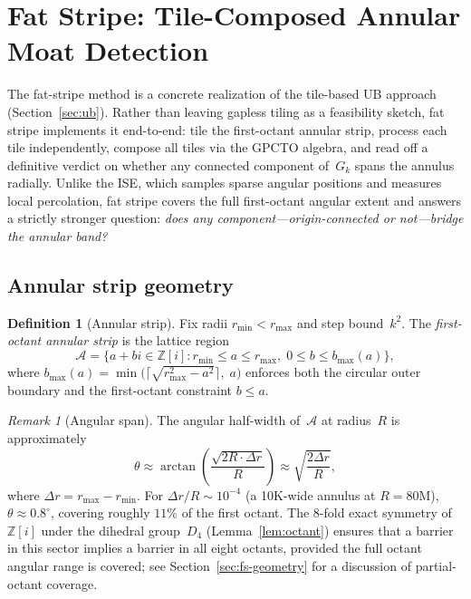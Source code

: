 \documentclass[11pt,a4paper]{article}
\newcommand{\Zi}{\mathbb{Z}[i]}
\newcommand{\Gk}{G_k}
\theoremstyle{definition}
\newtheorem{definition}{Definition}[section]
\theoremstyle{plain}
\theoremstyle{remark}
\newtheorem{remark}[theorem]{Remark}
\begin{document}
\section{Fat Stripe: Tile-Composed Annular Moat Detection}\label{sec:fat-stripe}

The fat-stripe method is a concrete realization of the tile-based UB approach (Section~\ref{sec:ub}).  Rather than leaving gapless tiling as a feasibility sketch, fat stripe implements it end-to-end: tile the first-octant annular strip, process each tile independently, compose all tiles via the GPCTO algebra, and read off a definitive verdict on whether any connected component of~$\Gk$ spans the annulus radially.  Unlike the ISE, which samples sparse angular positions and measures local percolation, fat stripe covers the full first-octant angular extent and answers a strictly stronger question: \emph{does any component---origin-connected or not---bridge the annular band?}

\subsection{Annular strip geometry}

\begin{definition}[Annular strip]\label{def:annular-strip}
Fix radii $r_{\min} < r_{\max}$ and step bound~$k^2$.  The \emph{first-octant annular strip} is the lattice region
\[
  \mathcal{A} = \{a + bi \in \Zi : r_{\min} \le a \le r_{\max},\; 0 \le b \le b_{\max}(a)\},
\]
where $b_{\max}(a) = \min\!\big(\lceil\sqrt{r_{\max}^2 - a^2}\rceil,\; a\big)$ enforces both the circular outer boundary and the first-octant constraint $b \le a$.
\end{definition}

\begin{remark}[Angular span]\label{rem:angular-span}
The angular half-width of~$\mathcal{A}$ at radius~$R$ is approximately
\[
  \theta \approx \arctan\!\left(\frac{\sqrt{2R \cdot \Delta r}}{R}\right) \approx \sqrt{\frac{2\Delta r}{R}},
\]
where $\Delta r = r_{\max} - r_{\min}$.  For $\Delta r / R \sim 10^{-4}$ (a 10K-wide annulus at $R = 80\text{M}$), $\theta \approx 0.8^\circ$, covering roughly $11\%$ of the first octant.  The 8-fold exact symmetry of~$\Zi$ under the dihedral group~$D_4$ (Lemma~\ref{lem:octant}) ensures that a barrier in this sector implies a barrier in all eight octants, provided the full octant angular range is covered; see Section~\ref{sec:fs-geometry} for a discussion of partial-octant coverage.
\end{remark}
\end{document}
